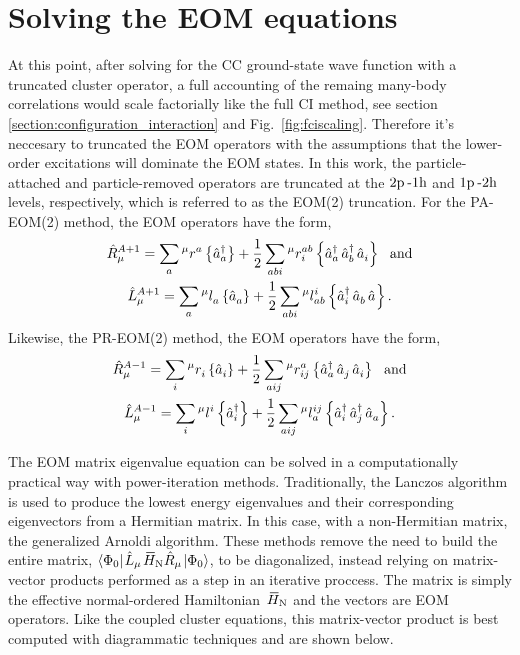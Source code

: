 \documentclass[thesis.tex]{subfiles}
\begin{document}
\section{Solving the EOM equations} \label{section:eom_solve}

At this point, after solving for the CC ground-state wave function with a truncated cluster operator, a full accounting of the remaing many-body correlations would scale factorially like the full CI method, see section \ref{section:configuration_interaction} and Fig.\ \ref{fig:fciscaling}.  Therefore it's neccesary to truncated the EOM operators with the assumptions that the lower-order excitations will dominate the EOM states.  In this work, the particle-attached and particle-removed operators are truncated at the $2\mathrm{p}\hspace{2pt}\text{-}1\mathrm{h}$ and $1\mathrm{p}\hspace{2pt}\text{-}2\mathrm{h}$ levels, respectively, which is referred to as the EOM(2) truncation.  For the PA-EOM(2) method, the EOM operators have the form, 
\begin{gather} \label{eq:pa-eom2}
  \Rop^{A+1}_{\mu} = \sum_{a}\rint{\mu}{a}{}\normord{\co{a}} + \frac{1}{2}\sum_{abi}\rint{\mu}{ab}{i}\normord{\co{a}\co{b}\ao{i}} \ \ \text{and} \notag \\
  \Lop^{A+1}_{\mu} = \sum_{a}\lint{\mu}{}{a}\normord{\ao{a}} + \frac{1}{2}\sum_{abi}\lint{\mu}{i}{ab}\normord{\co{i}\ao{b}\ao{}}.
\end{gather}
Likewise, the PR-EOM(2) method, the EOM operators have the form,
\begin{gather} \label{eq:pr-eom2}
  \Rop^{A-1}_{\mu} = \sum_{i}\rint{\mu}{}{i}\normord{\ao{i}} + \frac{1}{2}\sum_{aij}\rint{\mu}{a}{ij}\normord{\co{a}\ao{j}\ao{i}} \ \ \text{and} \notag \\
  \Lop^{A-1}_{\mu} = \sum_{i}\lint{\mu}{i}{}\normord{\co{i}} + \frac{1}{2}\sum_{aij}\lint{\mu}{ij}{a}\normord{\co{i}\co{j}\ao{a}}.
\end{gather}

The EOM matrix eigenvalue equation can be solved in a computationally practical way with power-iteration methods.  Traditionally, the Lanczos algorithm is used to produce the lowest energy eigenvalues and their corresponding eigenvectors from a Hermitian matrix.  In this case, with a non-Hermitian matrix, the generalized Arnoldi algorithm.  These methods remove the need to build the entire matrix, $\element{\Ref}{\Lop_{\mu}\EHamN\Rop_{\mu}}{\Ref}$, to be diagonalized, instead relying on matrix-vector products performed as a step in an iterative proccess.  The matrix is simply the effective normal-ordered Hamiltonian $\EHamN$ and the vectors are EOM operators.  Like the coupled cluster equations, this matrix-vector product is best computed with diagrammatic techniques and are shown below.
\end{document}
